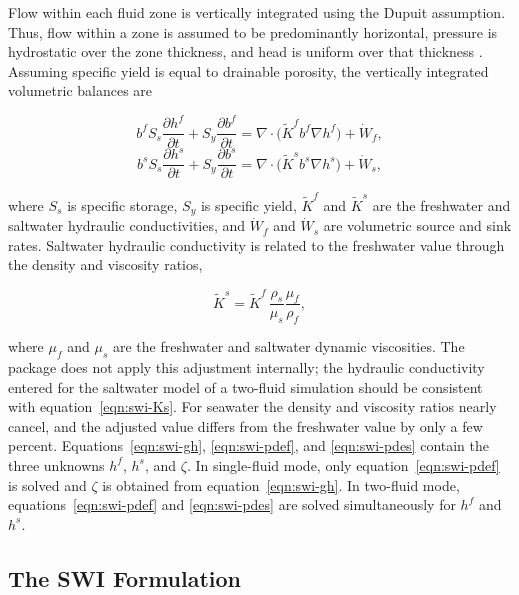 Flow within each fluid zone is vertically integrated using the Dupuit assumption. Thus, flow within a zone is assumed to be predominantly horizontal, pressure is hydrostatic over the zone thickness, and head is uniform over that thickness \citep{bear1979}. Assuming specific yield is equal to drainable porosity, the vertically integrated volumetric balances are

\begin{equation}
\label{eqn:swi-pdef}
b^{f}S_{s}\frac{\partial h^{f}}{\partial t}+S_{y}\frac{\partial b^{f}}{\partial t}
=\nabla\!\cdot\!\big(\tilde K^{f}b^{f}\nabla h^{f}\big)+\dot W_{f},
\end{equation}
\begin{equation}
\label{eqn:swi-pdes}
b^{s}S_{s}\frac{\partial h^{s}}{\partial t}+S_{y}\frac{\partial b^{s}}{\partial t}
=\nabla\!\cdot\!\big(\tilde K^{s}b^{s}\nabla h^{s}\big)+\dot W_{s},
\end{equation}

\noindent where $S_{s}$ is specific storage, $S_{y}$ is specific yield, $\tilde K^{f}$ and $\tilde K^{s}$ are the freshwater and saltwater hydraulic conductivities, and $\dot W_{f}$ and $\dot W_{s}$ are volumetric source and sink rates. Saltwater hydraulic conductivity is related to the freshwater value through the density and viscosity ratios,

\begin{equation}
\label{eqn:swi-Ks}
\tilde K^{s}=\tilde K^{f}\,\frac{\rho_{s}}{\mu_{s}}\frac{\mu_{f}}{\rho_{f}},
\end{equation}

\noindent where $\mu_{f}$ and $\mu_{s}$ are the freshwater and saltwater dynamic viscosities. The package does not apply this adjustment internally; the hydraulic conductivity entered for the saltwater model of a two-fluid simulation should be consistent with equation~\ref{eqn:swi-Ks}. For seawater the density and viscosity ratios nearly cancel, and the adjusted value differs from the freshwater value by only a few percent. Equations~\ref{eqn:swi-gh}, \ref{eqn:swi-pdef}, and \ref{eqn:swi-pdes} contain the three unknowns $h^{f}$, $h^{s}$, and $\zeta$. In single-fluid mode, only equation~\ref{eqn:swi-pdef} is solved and $\zeta$ is obtained from equation~\ref{eqn:swi-gh}. In two-fluid mode, equations~\ref{eqn:swi-pdef} and \ref{eqn:swi-pdes} are solved simultaneously for $h^{f}$ and $h^{s}$.

\subsection{The SWI Formulation}
\label{sec:swi-override}


